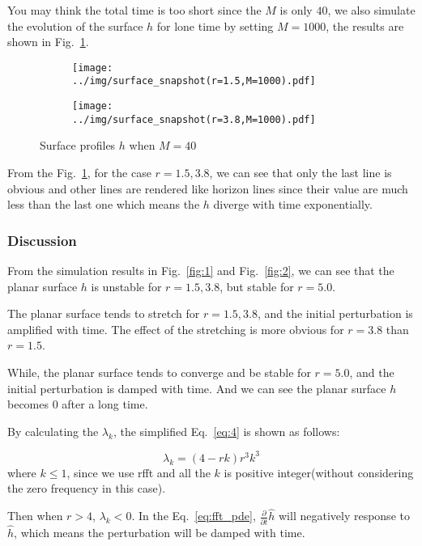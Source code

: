 \documentclass[runningheads]{llncs}
\begin{document}
You may think the total time is too short since the $M$ is only $40$, 
we also simulate the evolution of the surface $h$ for lone time by setting $M=1000$, the results are shown in Fig.~\ref{fig:3}.

\begin{figure}[!htbp]
    \centering
    \begin{subfigure}{.4\textwidth}
        \centering
        \texttt{[image: ../img/surface\_snapshot(r=1.5,M=1000).pdf]}  
    \end{subfigure}
    \begin{subfigure}{.4\textwidth}
        \centering
        \texttt{[image: ../img/surface\_snapshot(r=3.8,M=1000).pdf]}  
    \end{subfigure}
    \caption{Surface profiles $h$ when $M=40$}
    \label{fig:3}
\end{figure}
From the Fig.~\ref{fig:3}, for the case $r=1.5,3.8$, we can see that only the last line is obvious 
and other lines are rendered like horizon lines since their value are much less than the last one which means the $h$ diverge with time exponentially.

\subsubsection{Discussion}
From the simulation results in Fig.~\ref{fig:1} and Fig.~\ref{fig:2}, we can see that the planar surface $h$ is unstable for $r=1.5,3.8$, but stable for $r=5.0$.

The planar surface tends to stretch for $r=1.5,3.8$, and the initial perturbation is amplified with time.
The effect of the stretching is more obvious for $r=3.8$ than $r=1.5$.

While, the planar surface tends to converge and be stable for $r=5.0$, and the initial perturbation is damped with time.
And we can see the planar surface $h$ becomes $0$ after a long time.

By calculating the $\lambda_k$, the simplified Eq.~\eqref{eq:4} is shown as follows:

\begin{equation}
    \label{eq:4}
    \lambda_k = (4-rk)r^3k^3
\end{equation}
where $k \leq 1$, since we use rfft and all the $k$ is positive integer(without considering the zero frequency in this case).

Then when $r > 4$, $\lambda_k < 0$. 
In the Eq.~\eqref{eq:fft_pde}, $\frac{\partial}{\partial t}\hat{h}$ will negatively response to $\hat{h}$, which means the perturbation will be damped with time.
\end{document}
